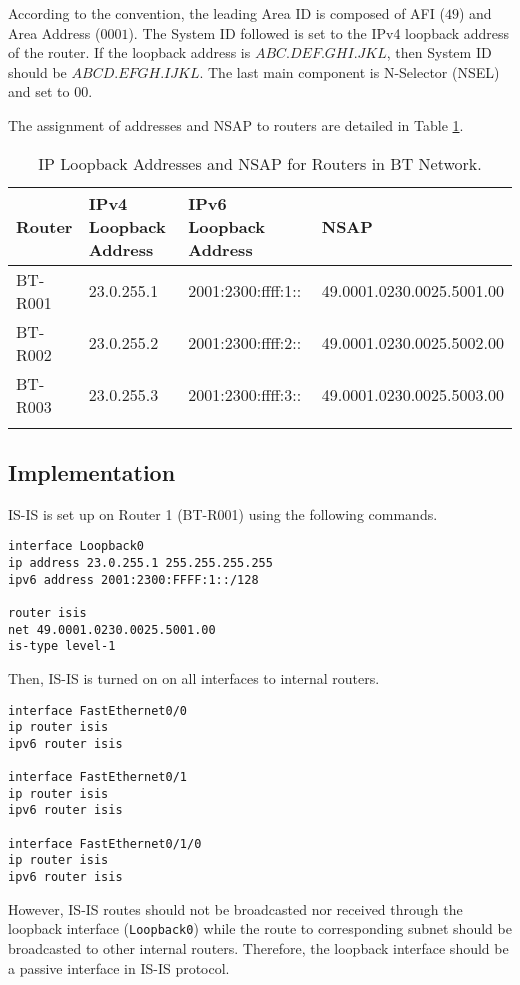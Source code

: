 According to the convention, the leading Area ID is composed of AFI ($49$) and Area Address ($0001$). 
The System ID followed is set to the IPv4 loopback address of the router. If the loopback address is $ABC.DEF.GHI.JKL$, then System ID should be $ABCD.EFGH.IJKL$.
The last main component is N-Selector (NSEL) and set to $00$.

The assignment of addresses and NSAP to routers are detailed in Table \ref{tab:isis}.

\begin{longtable}[]{@{}llll@{}}
\toprule
Router & IPv4 Loopback Address & IPv6 Loopback Address & NSAP\tabularnewline
\midrule
\endhead
BT-R001 & 23.0.255.1 & 2001:2300:ffff:1:: & 49.0001.0230.0025.5001.00\tabularnewline
BT-R002 & 23.0.255.2 & 2001:2300:ffff:2:: & 49.0001.0230.0025.5002.00\tabularnewline
BT-R003 & 23.0.255.3 & 2001:2300:ffff:3:: & 49.0001.0230.0025.5003.00\tabularnewline
\bottomrule
\caption{IP Loopback Addresses and NSAP for Routers in BT Network.}
\label{tab:isis}
\end{longtable}



\subsection{Implementation}

IS-IS is set up on Router 1 (BT-R001) using the following commands.

\begin{lstlisting}
interface Loopback0
ip address 23.0.255.1 255.255.255.255
ipv6 address 2001:2300:FFFF:1::/128

router isis
net 49.0001.0230.0025.5001.00
is-type level-1
\end{lstlisting}

Then, IS-IS is turned on on all interfaces to internal routers.

\begin{lstlisting}
interface FastEthernet0/0
ip router isis
ipv6 router isis

interface FastEthernet0/1
ip router isis
ipv6 router isis

interface FastEthernet0/1/0
ip router isis
ipv6 router isis
\end{lstlisting}

\clearpage

However, IS-IS routes should not be broadcasted nor received through the loopback interface (\texttt{Loopback0}) while the route to corresponding subnet should be broadcasted to other internal routers. Therefore, the loopback interface should be a passive interface in IS-IS protocol.

